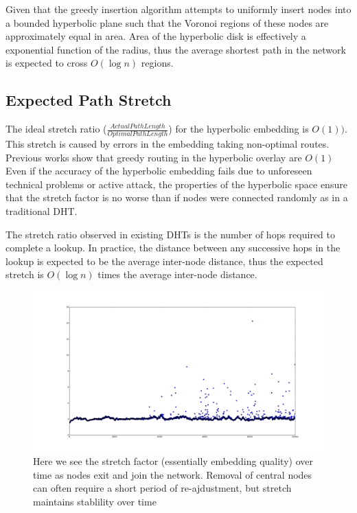 Given that the greedy insertion algorithm attempts to uniformly insert nodes into a bounded hyperbolic plane such that the Voronoi regions of these nodes are approximately equal in area.
Area of the hyperbolic disk is effectively a exponential function of the radius, thus the average shortest path in the network is expected to cross $O(\log{n})$ regions.

\subsection{Expected Path Stretch}

The ideal stretch ratio ($\frac{\mathit{Actual Path Length}}{\mathit{Optimal Path Length}}$) for the hyperbolic embedding is $O(1))$.
This stretch is caused by errors in the embedding taking non-optimal routes.
Previous works show that greedy routing in the hyperbolic overlay are $O(1)$
Even if the accuracy of the hyperbolic embedding fails due to unforeseen technical problems or active attack, the properties of the hyperbolic space ensure that the stretch factor is no worse than if nodes were connected randomly as in a traditional DHT.

The stretch ratio observed in existing DHTs is the number of hops required to complete a lookup.
In practice, the distance between any successive hops in the lookup is expected to be the average inter-node distance, thus the expected stretch is $O(\log{n})$ times the average inter-node distance. 

\begin{figure}[H]
	\includegraphics[width=\textwidth]{churn_stretch}
	\caption{Here we see the stretch factor (essentially embedding quality) over time as nodes exit and join the network. Removal of central nodes can often require a short period of re-ajdustment, but stretch maintains stablility over time}
\end{figure}


